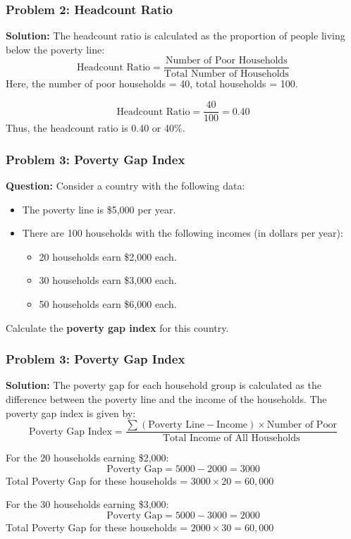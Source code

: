 \documentclass{beamer}
\begin{document}
\begin{frame}
\frametitle{Problem 2: Headcount Ratio}

\textbf{Solution:}
The headcount ratio is calculated as the proportion of people living below the poverty line:
\[
\text{Headcount Ratio} = \frac{\text{Number of Poor Households}}{\text{Total Number of Households}}
\]
Here, the number of poor households = 40, total households = 100.

\[
\text{Headcount Ratio} = \frac{40}{100} = 0.40
\]
Thus, the headcount ratio is 0.40 or 40\%.

\end{frame}

\begin{frame}
\frametitle{Problem 3: Poverty Gap Index}
\textbf{Question:}
Consider a country with the following data:
\begin{itemize}
    \item The poverty line is \$5,000 per year.
    \item There are 100 households with the following incomes (in dollars per year):
    \begin{itemize}
        \item 20 households earn \$2,000 each.
        \item 30 households earn \$3,000 each.
        \item 50 households earn \$6,000 each.
    \end{itemize}
\end{itemize}
Calculate the \textbf{poverty gap index} for this country.


\end{frame}


\begin{frame}
\frametitle{Problem 3: Poverty Gap Index}

\textbf{Solution:}
The poverty gap for each household group is calculated as the difference between the poverty line and the income of the households. The poverty gap index is given by:
\[
\text{Poverty Gap Index} = \frac{\sum (\text{Poverty Line} - \text{Income}) \times \text{Number of Poor}}{\text{Total Income of All Households}}
\]

For the 20 households earning \$2,000:
\[
\text{Poverty Gap} = 5000 - 2000 = 3000
\]
Total Poverty Gap for these households = \( 3000 \times 20 = 60,000 \)

For the 30 households earning \$3,000:
\[
\text{Poverty Gap} = 5000 - 3000 = 2000
\]
Total Poverty Gap for these households = \( 2000 \times 30 = 60,000 \)

\end{frame}
\end{document}
